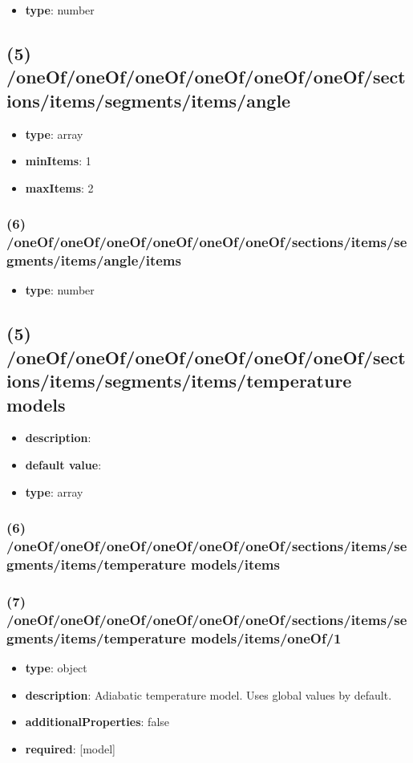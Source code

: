 \begin{itemize}[leftmargin=6em]\item {\bf type}: number
\end{itemize}\subsection{(5) /oneOf/oneOf/oneOf/oneOf/oneOf/oneOf/sections/items/segments/items/angle}
\begin{itemize}[leftmargin=5em]\item {\bf type}: array
\item {\bf minItems}: 1
\item {\bf maxItems}: 2
\end{itemize}\subsubsection{(6) /oneOf/oneOf/oneOf/oneOf/oneOf/oneOf/sections/items/segments/items/angle/items}
\begin{itemize}[leftmargin=6em]\item {\bf type}: number
\end{itemize}\subsection{(5) /oneOf/oneOf/oneOf/oneOf/oneOf/oneOf/sections/items/segments/items/temperature models}
\begin{itemize}[leftmargin=5em]\item {\bf description}: 
\item {\bf default value}: 
\item {\bf type}: array
\end{itemize}\subsubsection{(6) /oneOf/oneOf/oneOf/oneOf/oneOf/oneOf/sections/items/segments/items/temperature models/items}

\subsubsection{(7) /oneOf/oneOf/oneOf/oneOf/oneOf/oneOf/sections/items/segments/items/temperature models/items/oneOf/1}
\begin{itemize}[leftmargin=7em]\item {\bf type}: object
\item {\bf description}: Adiabatic temperature model. Uses global values by default.
\item {\bf additionalProperties}: false
\item {\bf required}: [model]\end{itemize}

